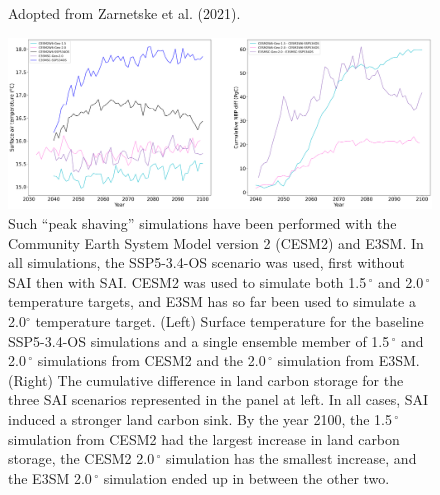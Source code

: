 \begin{figure}
{		%
		Adopted from Zarnetske et al. (2021).
	}\label{fig:peak_shaving}
\end{figure}

\vskip0.25in

\begin{figure}
	\begin{center}
		\includegraphics[width=\columnwidth]{figures/e3sm_geo_global_ts_tas_nbp.png}
	\end{center}
	\caption{Such ``peak shaving'' simulations have been performed with the Community Earth System Model version 2 (CESM2) and E3SM. In all simulations, the SSP5-3.4-OS scenario was used, first without SAI then with SAI. CESM2 was used to simulate both 1.5\,$^\circ$ and 2.0\,$^\circ$ temperature targets, and E3SM has so far been used to simulate a 2.0$^\circ$ temperature target. (Left) Surface temperature for the baseline SSP5-3.4-OS simulations and a single ensemble member of 1.5\,$^\circ$ and 2.0\,$^\circ$ simulations from CESM2 and the 2.0\,$^\circ$ simulation from E3SM. (Right) The cumulative difference in land carbon storage for the three SAI scenarios represented in the panel at left. In all cases, SAI induced a stronger land carbon sink. By the year 2100, the 1.5\,$^\circ$ simulation from CESM2 had the largest increase in land carbon storage, the CESM2 2.0\,$^\circ$ simulation has the smallest increase, and the E3SM 2.0\,$^\circ$ simulation ended up in between the other two.}\label{fig:e3sm_tas_nbp}
\end{figure}

